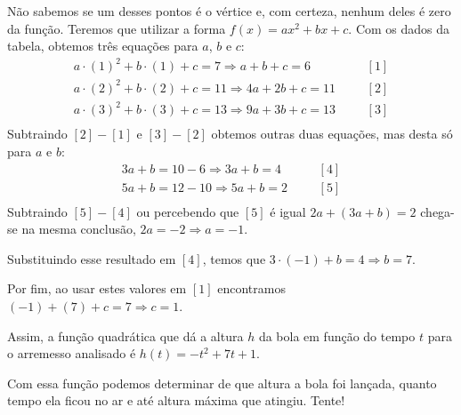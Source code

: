 \begin{example}{}
Não sabemos se um desses pontos é o vértice e, com certeza, nenhum deles é zero da função. Teremos que utilizar a forma \(f(x)=ax^2+bx+c\). Com os dados da tabela, obtemos três equações para \(a\), \(b\) e \(c\):
\begin{equation*}
\begin{split}a \cdot (1)^2+b \cdot (1)+c=7 \Rightarrow a+b+c=6 \;\;\;\;\;\; & [1] \\
a \cdot (2)^2+b \cdot (2)+c=11 \Rightarrow 4a+2b+c=11 \;\;\;\;\;\; & [2] \\
a \cdot (3)^2+b \cdot (3)+c=13 \Rightarrow 9a+3b+c=13 \;\;\;\;\;\; & [3] \\\end{split}
\end{equation*}
Subtraindo \([2]-[1]\) e \([3]-[2]\) obtemos outras duas equações, mas desta só para \(a\) e \(b\):
\begin{equation*}
\begin{split}3a+b=10-6 \Rightarrow 3a+b=4 \;\;\;\;\;\; & [4] \\
5a+b=12-10 \Rightarrow 5a+b=2 \;\;\;\;\;\; & [5] \\\end{split}
\end{equation*}
Subtraindo \([5]-[4]\) ou percebendo que \([5]\) é igual \(2a+(3a+b)=2\) chega-se na mesma conclusão, \(2a=-2 \Rightarrow a=-1\).

Substituindo esse resultado em \([4]\), temos que \(3 \cdot (-1)+b=4 \Rightarrow b=7\).

Por fim, ao usar estes valores em \([1]\) encontramos \((-1)+(7)+c=7 \Rightarrow c=1\).

Assim, a função quadrática que dá a altura \(h\) da bola em função do tempo \(t\) para o arremesso analisado é \(h(t)=-t^2+7t+1\).

Com essa função podemos determinar de que altura a bola foi lançada, quanto tempo ela ficou no ar e até altura máxima que atingiu. Tente!
\end{example}


